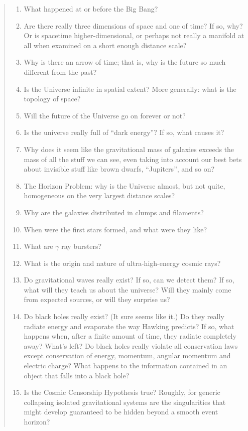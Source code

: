\documentclass{article}
\begin{document}
\begin{quote}
\begin{enumerate}
\def\labelenumi{\arabic{enumi})}
\item
  What happened at or before the Big Bang?
\item
  Are there really three dimensions of space and one of time? If so,
  why? Or is spacetime higher-dimensional, or perhaps not really a
  manifold at all when examined on a short enough distance scale?
\item
  Why is there an arrow of time; that is, why is the future so much
  different from the past?
\item
  Is the Universe infinite in spatial extent? More generally: what is
  the topology of space?
\item
  Will the future of the Universe go on forever or not?
\item
  Is the universe really full of ``dark energy''? If so, what causes it?
\item
  Why does it seem like the gravitational mass of galaxies exceeds the
  mass of all the stuff we can see, even taking into account our best
  bets about invisible stuff like brown dwarfs, ``Jupiters'', and so on?
\item
  The Horizon Problem: why is the Universe almost, but not quite,
  homogeneous on the very largest distance scales?
\item
  Why are the galaxies distributed in clumps and filaments?
\item
  When were the first stars formed, and what were they like?
\item
  What are \(\gamma\) ray bursters?
\item
  What is the origin and nature of ultra-high-energy cosmic rays?
\item
  Do gravitational waves really exist? If so, can we detect them? If so,
  what will they teach us about the universe? Will they mainly come from
  expected sources, or will they surprise us?
\item
  Do black holes really exist? (It sure seems like it.) Do they really
  radiate energy and evaporate the way Hawking predicts? If so, what
  happens when, after a finite amount of time, they radiate completely
  away? What's left? Do black holes really violate all conservation laws
  except conservation of energy, momentum, angular momentum and electric
  charge? What happens to the information contained in an object that
  falls into a black hole?
\item
  Is the Cosmic Censorship Hypothesis true? Roughly, for generic
  collapsing isolated gravitational systems are the singularities that
  might develop guaranteed to be hidden beyond a smooth event horizon?
\end{enumerate}


\end{quote}
\end{document}
